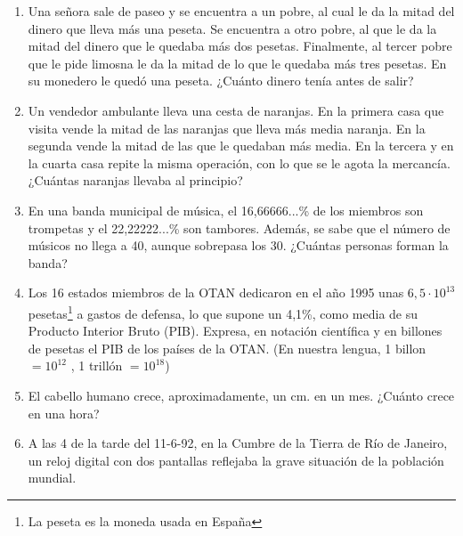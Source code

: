 \documentclass[twoside]{article}
\begin{document}
\begin{enumerate}
\begin{enumerate}
\begin{multicols}{3}
\end{multicols}
\end{enumerate}
Efectúa ordenadamente las siguientes operaciones:
\begin{enumerate}
\end{enumerate}
\item Una señora sale de paseo y se encuentra a un pobre, al cual le da la mitad del dinero que lleva más una peseta. Se encuentra a otro pobre, al que le da la mitad del dinero que le quedaba más dos pesetas. Finalmente, al tercer pobre que le pide limosna le da
la mitad de lo que le quedaba más tres pesetas. En su monedero le quedó una peseta. ¿Cuánto dinero tenía antes de salir?
\item Un vendedor ambulante lleva una cesta de naranjas. En la primera casa que visita vende la mitad de las naranjas que lleva más media naranja. En la segunda vende la mitad de las que le quedaban más media. En la tercera y en la cuarta casa repite la
misma operación, con lo que se le agota la mercancía. ¿Cuántas naranjas llevaba al principio?
\item En una banda municipal de música, el 16,66666...\% de los miembros son trompetas y el 22,22222...\% son tambores. Además, se sabe que el número de músicos no llega a 40, aunque sobrepasa los 30. ¿Cuántas personas forman la banda?
\item Los 16 estados miembros de la OTAN dedicaron en el año 1995 unas $6,5 \cdot 10^{13}$ pesetas\footnote{La peseta es la moneda usada en España} a gastos de defensa, lo que supone un 4,1\%, como media de su Producto Interior Bruto (PIB). Expresa, en notación científica y en billones de pesetas el PIB de los países de la OTAN. (En nuestra lengua, 1 billon $=10^{12}$ , 1 trillón $= 10^{18}$)
\item El cabello humano crece, aproximadamente, un cm. en un mes. ¿Cuánto crece en una hora?
\item A las 4 de la tarde del 11-6-92, en la Cumbre de la Tierra de Río de Janeiro, un reloj digital con dos pantallas reflejaba la grave situación de la población mundial.\\

\end{enumerate}
\end{document}
